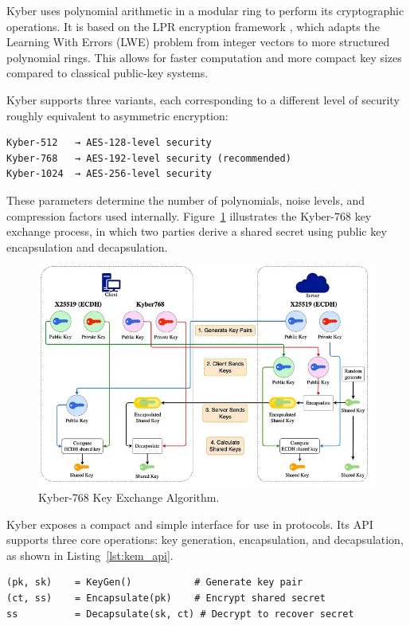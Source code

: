 Kyber uses polynomial arithmetic in a modular ring to perform its cryptographic operations. It is based on the LPR encryption framework \cite{kyber2021}, which adapts the Learning With Errors (LWE) problem from integer vectors to more structured polynomial rings. This allows for faster computation and more compact key sizes compared to classical public-key systems.

Kyber supports three variants, each corresponding to a different level of security roughly equivalent to asymmetric encryption:

\begin{verbatim}
Kyber-512   → AES-128-level security
Kyber-768   → AES-192-level security (recommended)
Kyber-1024  → AES-256-level security
\end{verbatim}

These parameters determine the number of polynomials, noise levels, and compression factors used internally. Figure~\ref{fig:kyber_768} illustrates the Kyber-768 key exchange process, in which two parties derive a shared secret using public key encapsulation and decapsulation.

\begin{figure}[htbp]
\centering
\includegraphics[width=0.9\linewidth]{figures/kyber_768.png}
\caption{Kyber-768 Key Exchange Algorithm.}
\label{fig:kyber_768}
\end{figure}

Kyber exposes a compact and simple interface for use in protocols. Its API supports three core operations: key generation, encapsulation, and decapsulation, as shown in Listing~\ref{lst:kem_api}.

\begin{lstlisting}[style=kemstyle, caption={Kyber KEM API}, label={lst:kem_api}]
(pk, sk)    = KeyGen()           # Generate key pair
(ct, ss)    = Encapsulate(pk)    # Encrypt shared secret
ss          = Decapsulate(sk, ct) # Decrypt to recover secret
\end{lstlisting}


